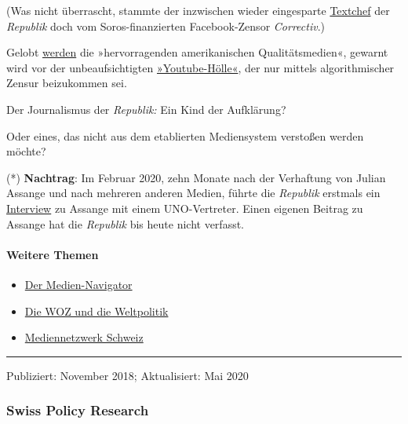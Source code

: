 (Was nicht überrascht, stammte der inzwischen wieder eingesparte
\href{https://www.republik.ch/~ahauptmeier}{Textchef} der
\emph{Republik} doch vom Soros-finanzierten Facebook-Zensor
\emph{Correctiv}.)

Gelobt
\href{https://www.republik.ch/2018/08/25/wer-rettet-die-demokratie}{werden}
die »hervorragenden amerikanischen Qualitätsmedien«, gewarnt wird vor
der unbeaufsichtigten
\href{https://www.republik.ch/2018/07/31/es-brodelt-in-der-youtube-hoelle}{»Youtube-Hölle«},
der nur mittels algorithmischer Zensur beizukommen sei.

Der Journalismus der \emph{Republik:} Ein Kind der Aufklärung?

Oder eines, das nicht aus dem etablierten Mediensystem verstoßen werden
möchte?

(*) \textbf{Nachtrag}: Im Februar 2020, zehn Monate nach der Verhaftung
von Julian Assange und nach mehreren anderen Medien, führte die
\emph{Republik} erstmals ein
\href{https://swprs.org/assange-die-wirklichen-fragen/}{Interview} zu
Assange mit einem UNO-Vertreter. Einen eigenen Beitrag zu Assange hat
die \emph{Republik} bis heute nicht verfasst.

\hypertarget{weitere-themen}{%
\paragraph{Weitere Themen}\label{weitere-themen}}

\begin{itemize}
\tightlist
\item
  \href{https://swprs.org/medien-navigator/}{Der Medien-Navigator}
\item
  \href{https://swprs.org/2017/03/01/die-woz-und-die-weltpolitik/}{Die
  WOZ und die Weltpolitik}
\item
  \href{https://swprs.org/netzwerk-medien-schweiz/}{Mediennetzwerk
  Schweiz}
\end{itemize}

\begin{center}\rule{0.5\linewidth}{\linethickness}\end{center}

Publiziert: November 2018; Aktualisiert: Mai 2020

\hypertarget{swiss-policy-research}{%
\subsubsection{Swiss Policy Research}\label{swiss-policy-research}}

